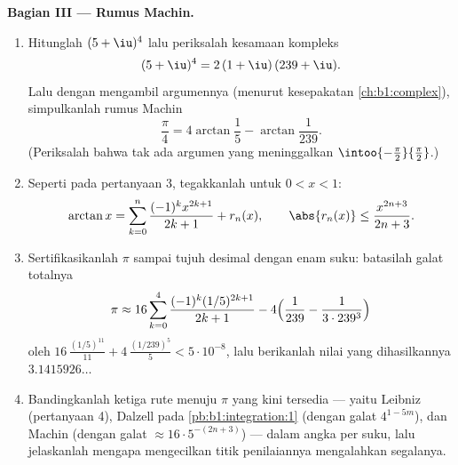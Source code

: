 \begin{problem}
\medskip
\noindent\textbf{Bagian III --- Rumus Machin.}
\begin{enumerate}[resume]
  \item Hitunglah $(5 + \iu)^4$ lalu periksalah kesamaan kompleks
        \[
        (5 + \iu)^4 = 2\,(1 + \iu)\,(239 + \iu) .
        \]
        Lalu dengan mengambil argumennya (menurut kesepakatan \cref{ch:b1:complex}),
        simpulkanlah rumus Machin
        \[
        \frac\pi4 = 4\arctan\frac15 - \arctan\frac{1}{239} .
        \]
        (Periksalah bahwa tak ada argumen yang meninggalkan
        $\intoo{-\frac\pi2}{\frac\pi2}$.)
  \item Seperti pada pertanyaan 3, tegakkanlah untuk $0 < x < 1$:
        \[
        \arctan x = \sum_{k=0}^{n} \frac{(-1)^k
        x^{2k+1}}{2k+1} + r_n(x), \qquad \abs{r_n(x)} \leq
        \frac{x^{2n+3}}{2n+3} .
        \]
  \item Sertifikasikanlah $\pi$ sampai tujuh desimal dengan enam suku: batasilah
        galat totalnya
        \[
        \pi \approx 16\sum_{k=0}^{4}
        \frac{(-1)^k (1/5)^{2k+1}}{2k+1}
        - 4\Bigl(\frac{1}{239} - \frac{1}{3\cdot239^3}\Bigr)
        \]
        oleh $16\,\frac{(1/5)^{11}}{11} +
        4\,\frac{(1/239)^5}{5} < 5\cdot10^{-8}$, lalu berikanlah
        nilai yang dihasilkannya $3.1415926\dots$
  \item Bandingkanlah ketiga rute menuju $\pi$ yang kini tersedia ---
        yaitu Leibniz (pertanyaan 4),  Dalzell pada
        \cref{pb:b1:integration:1} (dengan galat $4^{1-5m}$), dan Machin
        (dengan galat $\approx 16\cdot 5^{-(2n+3)}$) --- dalam angka per
        suku, lalu jelaskanlah mengapa mengecilkan titik penilaiannya
        mengalahkan segalanya.
\end{enumerate}


\end{problem}
